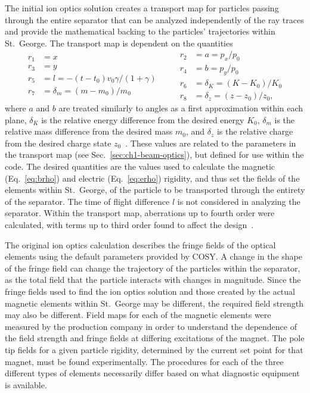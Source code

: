 \newpage
The initial ion optics solution creates a transport map for particles
passing through the entire separator that can be analyzed independently
of the ray traces and provide the mathematical backing to the particles'
trajectories within St.\ George. The transport map is dependent on the
quantities
\begin{equation}
    \label{eq:cosyvars}
    \begin{split}
        r_1 &= x \\
        r_3 &= y \\
        r_5 &= l = -(t - t_0)v_0\gamma/(1 + \gamma) \\
        r_7 &= \delta_m = (m - m_0)/m_0
    \end{split}
    \quad\quad
    \begin{split}
        r_2 &= a = p_x/p_0 \\
        r_4 &= b = p_y/p_0 \\
        r_6 &= \delta_K = (K - K_0)/K_0\\
        r_8 &= \delta_z = (z - z_0)/z_0,
    \end{split}
\end{equation}
where $a$ and $b$ are treated similarly to angles as a first
approximation within each plane, $\delta_K$ is the relative energy
difference from the desired energy $K_0$, $\delta_m$ is the relative
mass difference from the desired mass $m_0$, and $\delta_z$ is the
relative charge from the desired charge state $z_0$~\cite{COSY}. These
values are related to the parameters in the transport map (see
Sec.~\ref{sec:ch1-beam-optics}), but defined for use within the code.
The desired quantities are the values used to calculate the magnetic
(Eq.~\ref{eq:brho}) and electric (Eq.~\ref{eq:erho}) rigidity, and thus
set the fields of the elements within St.\ George, of the particle to be
transported through the entirety of the separator. The time of flight
difference $l$ is not considered in analyzing the separator. Within the
transport map, aberrations up to fourth order were calculated, with
terms up to third order found to affect the design~\cite{Couder2008}.

The original ion optics calculation describes the fringe fields of the
optical elements using the default parameters provided by COSY. A change
in the shape of the fringe field can change the trajectory of the
particles within the separator, as the total field that the particle
interacts with changes in magnitude. Since the fringe fields used to
find the ion optics solution and those created by the actual magnetic
elements within St.\ George may be different, the required field
strength may also be different. Field maps for each of the magnetic
elements were measured by the production company in order to understand
the dependence of the field strength and fringe fields at differing
excitations of the magnet. The pole tip fields for a given particle
rigidity, determined by the current set point for that magnet, must be
found experimentally. The procedures for each of the three different
types of elements necessarily differ based on what diagnostic equipment
is available.

